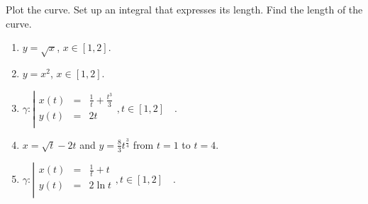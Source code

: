 Plot the curve. Set up an integral that expresses its length. Find the length of the curve. 
\begin{enumerate}[ref={\fcProblemRef}]
\item $y=\sqrt{x}$, $x\in [1, 2]$.

\item $y=x^2$, $x\in [1, 2]$.

\item 
$\gamma:\left| 
\begin{array}{rcl}
x(t)&=&\frac{1}{t}+\frac{t^3}{3}\\
y(t)&=&2t\\
\end{array}\right., t\in [1,2]\quad . $
\item \label{problemlengthx=sqrt(t)-2t,y=8/3t^(3/4)} $\displaystyle x = \sqrt{t} - 2t$ and $\displaystyle y = \frac{8}{3}t^{\frac{3}{4}}$ from $t = 1$ to $t = 4$.

\item $\gamma:\left| 
\begin{array}{rcl}
x(t)&=&\frac{1}{t}+t\\
y(t)&=&2\ln t\\
\end{array}\right., t\in [1,2]\quad . $

\end{enumerate}
